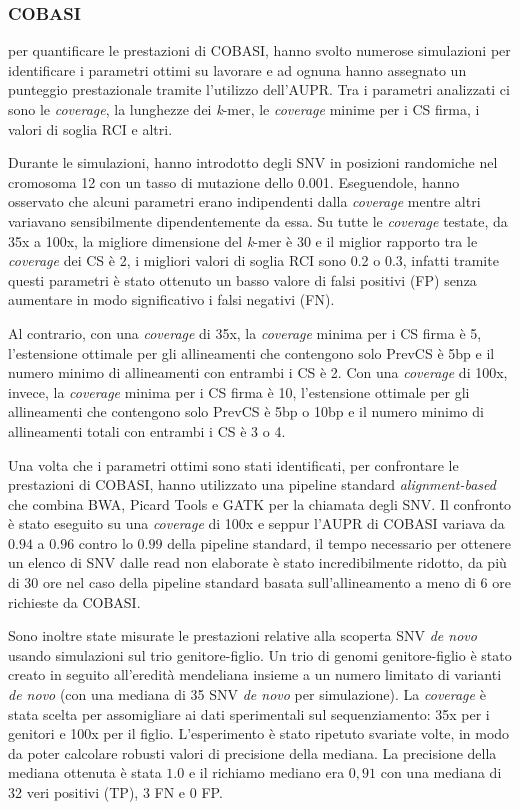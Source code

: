\documentclass[../main.tex]{subfiles}
\begin{document}
\subsubsection{COBASI}

\cite{gomez-romero2018cobasi} per quantificare le prestazioni di COBASI, hanno svolto numerose simulazioni per identificare i parametri ottimi su lavorare e ad ognuna hanno assegnato un punteggio prestazionale tramite l'utilizzo dell'AUPR. Tra i parametri analizzati ci sono le \textit{coverage}, la lunghezze dei \textit{k}-mer, le \textit{coverage} minime per i CS firma, i valori di soglia RCI e altri.

Durante le simulazioni, \cite{gomez-romero2018cobasi} hanno introdotto degli SNV in posizioni randomiche nel cromosoma 12 con un tasso di mutazione dello 0.001. Eseguendole, hanno osservato che alcuni parametri erano indipendenti dalla \textit{coverage} mentre altri variavano sensibilmente dipendentemente da essa. Su tutte le \textit{coverage} testate, da 35x a 100x, la migliore dimensione del \textit{k}-mer è 30 e il miglior rapporto tra le \textit{coverage} dei CS è 2, i migliori valori di soglia RCI sono 0.2 o 0.3, infatti tramite questi parametri è stato ottenuto un basso valore di falsi positivi (FP) senza aumentare in modo significativo i falsi negativi (FN). 

Al contrario,  con una \textit{coverage} di 35x, la \textit{coverage} minima per i CS firma è 5, l'estensione ottimale per gli allineamenti che contengono solo PrevCS è 5bp e il numero minimo di allineamenti con entrambi i CS è 2. Con una \textit{coverage} di 100x, invece, la \textit{coverage} minima per i CS firma è 10, l'estensione ottimale per gli allineamenti che contengono solo PrevCS è 5bp o 10bp e il numero minimo di allineamenti totali con entrambi i CS è 3 o 4. 

Una volta che i parametri ottimi sono stati identificati, per confrontare le prestazioni di COBASI, \cite{gomez-romero2018cobasi} hanno utilizzato una pipeline standard \textit{alignment-based} che combina BWA, Picard Tools e GATK per la chiamata degli SNV. Il confronto è stato eseguito su una \textit{coverage} di 100x e seppur l'AUPR di COBASI variava da $0.94$ a $0.96$ contro lo $0.99$ della pipeline standard, il tempo necessario per ottenere un elenco di SNV dalle read non elaborate è stato incredibilmente ridotto, da più di 30 ore nel caso della pipeline standard basata sull'allineamento a meno di 6 ore richieste da COBASI.

Sono inoltre state misurate le prestazioni relative alla scoperta SNV \textit{de novo} usando simulazioni sul trio genitore-figlio. Un trio di genomi genitore-figlio è stato creato in seguito all'eredità mendeliana insieme a un numero limitato di varianti \textit{de novo} (con una mediana di 35 SNV \textit{de novo} per simulazione). La \textit{coverage} è stata scelta per assomigliare ai dati sperimentali sul sequenziamento: 35x per i genitori e 100x per il figlio. L'esperimento è stato ripetuto svariate volte, in modo da poter calcolare robusti valori di precisione della mediana. La precisione della mediana ottenuta è stata $1.0$ e il richiamo mediano era $0,91$ con una mediana di 32 veri positivi (TP), 3 FN e 0 FP.
\end{document}
